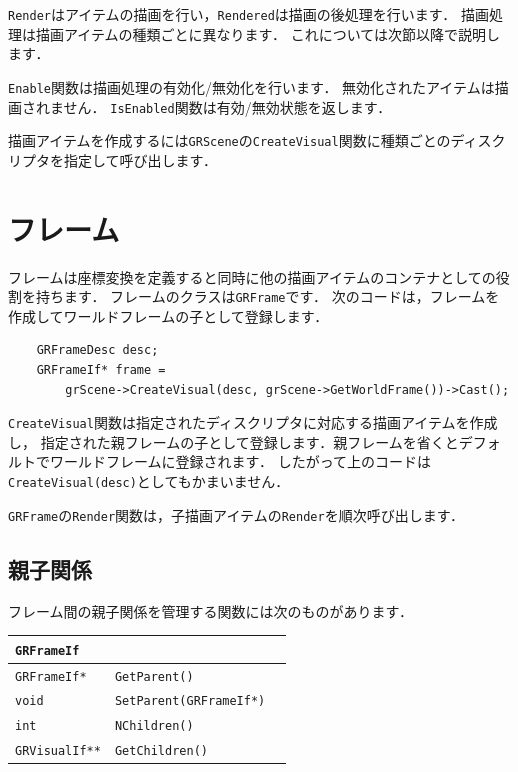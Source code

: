 \texttt{Render}はアイテムの描画を行い，\texttt{Rendered}は描画の後処理を行います．
\KLUDGE 描画処理は描画アイテムの種類ごとに異なります．
\KLUDGE これについては次節以降で説明します．

\texttt{Enable}関数は描画処理の有効化/無効化を行います．
\KLUDGE 無効化されたアイテムは描画されません．
\texttt{IsEnabled}関数は有効/無効状態を返します．

\KLUDGE 描画アイテムを作成するには\texttt{GRScene}の\texttt{CreateVisual}関数に種類ごとのディスクリプタを指定して呼び出します．


\section{フレーム}

\KLUDGE フレームは座標変換を定義すると同時に他の描画アイテムのコンテナとしての役割を持ちます．
\KLUDGE フレームのクラスは\texttt{GRFrame}です．
\KLUDGE 次のコードは，フレームを作成してワールドフレームの子として登録します．
\begin{verbatim}
    GRFrameDesc desc;
    GRFrameIf* frame =
        grScene->CreateVisual(desc, grScene->GetWorldFrame())->Cast();
\end{verbatim}
\texttt{CreateVisual}関数は指定されたディスクリプタに対応する描画アイテムを作成し，
\KLUDGE 指定された親フレームの子として登録します．親フレームを省くとデフォルトでワールドフレームに登録されます．
\KLUDGE したがって上のコードは\texttt{CreateVisual(desc)}としてもかまいません．

\texttt{GRFrame}の\texttt{Render}関数は，子描画アイテムの\texttt{Render}を順次呼び出します．


\subsection*{親子関係}

\KLUDGE フレーム間の親子関係を管理する関数には次のものがあります．

\begin{center}
\begin{tabular}{p{.20\hsize}p{.45\hsize}p{.25\hsize}}
\multicolumn{3}{l}{\texttt{GRFrameIf}}						\\ \midrule
\texttt{GRFrameIf*}		& \texttt{GetParent()}				& 	\\
\texttt{void} 			& \texttt{SetParent(GRFrameIf*)}	& 	\\
\texttt{int} 			& \texttt{NChildren()}				& 	\\
\texttt{GRVisualIf**} 	& \texttt{GetChildren()}			& 	\\
\end{tabular}
\end{center}

